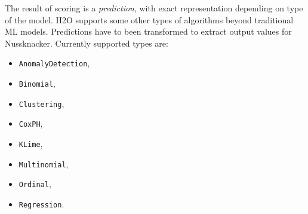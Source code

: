 The result of scoring is a \emph{prediction}, with exact representation depending on type of the model.
H2O supports some other types of algorithms beyond traditional ML models.
Predictions have to been transformed to extract output values for Nussknacker.
Currently supported types are:
\begin{multicols}{2}
\begin{itemize}
  \item \texttt{AnomalyDetection},
  \item \texttt{Binomial},
  \item \texttt{Clustering},
  \item \texttt{CoxPH},
  \item \texttt{KLime},
  \item \texttt{Multinomial},
  \item \texttt{Ordinal},
  \item \texttt{Regression}.
\end{itemize}
\end{multicols}
